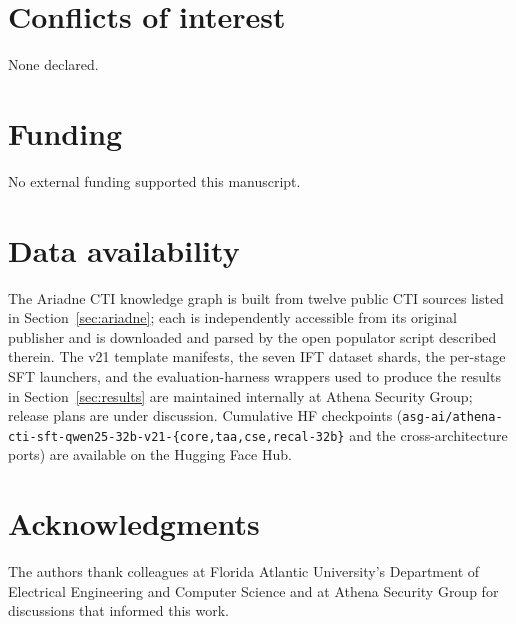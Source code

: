 \documentclass[unnumsec,webpdf,contemporary,large]{oup-authoring-template}
\theoremstyle{thmstyleone}
\theoremstyle{thmstyletwo}
\theoremstyle{thmstylethree}
\begin{document}
\section{Conflicts of interest}
None declared.

\section{Funding}
No external funding supported this manuscript.

\section{Data availability}
The Ariadne CTI knowledge graph is built from twelve public CTI sources listed in Section~\ref{sec:ariadne}; each is independently accessible from its original publisher and is downloaded and parsed by the open populator script described therein. The v21 template manifests, the seven IFT dataset shards, the per-stage SFT launchers, and the evaluation-harness wrappers used to produce the results in Section~\ref{sec:results} are maintained internally at Athena Security Group; release plans are under discussion. Cumulative HF checkpoints (\texttt{asg-ai/athena-cti-sft-qwen25-32b-v21-\{core,taa,cse,recal-32b\}} and the cross-architecture ports) are available on the Hugging Face Hub.

\section{Acknowledgments}
The authors thank colleagues at Florida Atlantic University's Department of Electrical Engineering and Computer Science and at Athena Security Group for discussions that informed this work.




\end{document}
